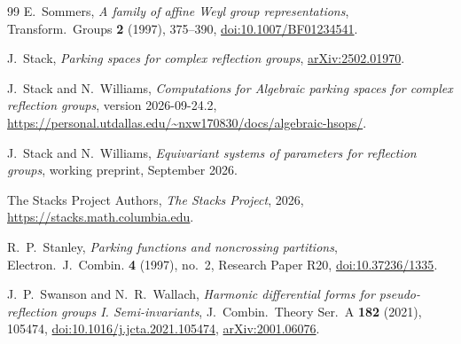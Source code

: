 \documentclass[11pt]{amsart}
\theoremstyle{definition}
\begin{document}
\begin{thebibliography}{99}
E.~Sommers, \emph{A family of affine Weyl group representations},
Transform.~Groups \textbf{2} (1997), 375--390,
\href{https://doi.org/10.1007/BF01234541}{doi:10.1007/BF01234541}.

J.~Stack, \emph{Parking spaces for complex reflection groups},
\href{https://arxiv.org/abs/2502.01970}{arXiv:2502.01970}.

J.~Stack and N.~Williams,
\emph{Computations for Algebraic parking spaces for complex reflection groups},
version 2026-09-24.2,
\url{https://personal.utdallas.edu/~nxw170830/docs/algebraic-hsops/}.

J.~Stack and N.~Williams,
\emph{Equivariant systems of parameters for reflection groups},
working preprint, September 2026.

The Stacks Project Authors,
\emph{The Stacks Project}, 2026,
\url{https://stacks.math.columbia.edu}.

R.~P.~Stanley,
\emph{Parking functions and noncrossing partitions},
Electron.~J.~Combin. \textbf{4} (1997), no.~2, Research Paper R20,
\href{https://doi.org/10.37236/1335}{doi:10.37236/1335}.

J.~P.~Swanson and N.~R.~Wallach,
\emph{Harmonic differential forms for pseudo-reflection groups I.
Semi-invariants},
J.~Combin.~Theory Ser.~A \textbf{182} (2021), 105474,
\href{https://doi.org/10.1016/j.jcta.2021.105474}{doi:10.1016/j.jcta.2021.105474},
\href{https://arxiv.org/abs/2001.06076}{arXiv:2001.06076}.

\end{thebibliography}

\endgroup
\end{document}
